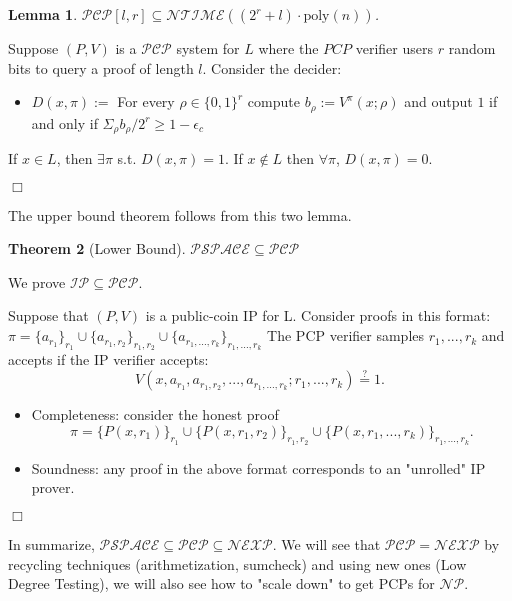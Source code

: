 \documentclass{article}
\newtheorem{theorem}{Theorem}
\newtheorem{lemma}[theorem]{Lemma}
\newenvironment{proof}{\noindent{\bf Proof:} \hspace*{1mm}}{
	\hspace*{\fill} $\Box$ }
\begin{document}
\begin{lemma}
  $\mathcal{PCP}[l, r] \subseteq \mathcal{NTIME}((2^r+l) \cdot \text{poly}(n))$.
\end{lemma}
\begin{proof}
  Suppose $(P,V)$ is a $\mathcal{PCP}$ system for $L$ where the $PCP$ verifier users $r$ random bits to query a proof of length $l$. Consider the decider:
  \begin{itemize}
    \item $D(x, \pi) :=$ For every $\rho \in \{0,1\}^r$ compute $b_{\rho} := V^{\pi} (x; \rho)$ and output $1$ if and only if $\Sigma_{\rho} b_{\rho}/2^{r} \geq 1 - \epsilon_{c}$
  \end{itemize}
  If $x \in  L$, then $\exists \pi$ s.t. $D(x, \pi) = 1$. If $x \notin L$ then $\forall \pi$, $D(x, \pi) = 0$.
\end{proof}
\par The upper bound theorem follows from this two lemma.
\begin{theorem}[Lower Bound]
  $\mathcal{PSPACE} \subseteq \mathcal{PCP}$
\end{theorem}
\begin{proof}
  We prove $\mathcal{IP} \subseteq \mathcal{PCP}$.
  \par Suppose that $(P, V)$ is a public-coin IP for L. Consider proofs in this format: $\pi = \{a_{r_1}\}_{r_1} \cup \{a_{r_1, r_2}\}_{r_1, r_2} \cup \{a_{r_1,...,r_k}\}_{r_1,...,r_k}$ The PCP verifier samples $r_1,...,r_k$ and accepts if the IP verifier accepts:
  $$
  V(x, a_{r_1}, a_{r_1, r_2},...,a_{r_1,...,r_k}; r_1,...,r_k) \overset{?}{=} 1.
  $$
  \begin{itemize}
    \item Completeness: consider the honest proof 
    $$\pi = \{P(x,r_1)\}_{r_1} \cup \{P(x,r_1,r_2)\}_{r_1, r_2} \cup \{P(x,r_1,...,r_k)\}_{r_1,...,r_k}.$$
    \item Soundness: any proof in the above format corresponds to an "unrolled" IP prover.
  \end{itemize}
\end{proof}
\par In summarize, $\mathcal{PSPACE} \subseteq \mathcal{PCP} \subseteq \mathcal{NEXP}$. We will see that $\mathcal{PCP} = \mathcal{NEXP}$ by recycling techniques (arithmetization, sumcheck) and using new ones (Low Degree Testing), we will also see how to "scale down" to get PCPs for $\mathcal{NP}$.


\end{document}
